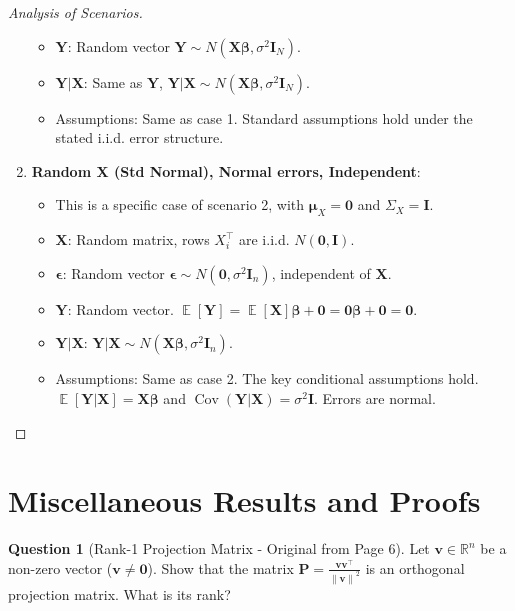 \documentclass[11pt, a4paper]{article}
\DeclareMathOperator{\E}{\mathbb{E}}             %
\DeclareMathOperator{\Cov}{\mathrm{Cov}}         %
\theoremstyle{definition}
\newtheorem{question}[theorem]{Question} %
\theoremstyle{remark}
\newcommand{\RR}{\mathbb{R}}             %
\newcommand{\mat}[1]{\mathbf{#1}}       %
\newcommand{\vect}[1]{\bm{#1}}          %
\newcommand{\transpose}{^{\top}}        %
\newcommand{\norm}[1]{\left\| #1 \right\|} %
\begin{document}
\begin{proof}[Analysis of Scenarios]
\begin{enumerate}
\begin{itemize}
            \item $\vect{Y}$: Random vector $\vect{Y} \sim N(\mat{X}\vect{\beta}, \sigma^2 \mat{I}_N)$.
            \item $\vect{Y}|\mat{X}$: Same as $\vect{Y}$, $\vect{Y}|\mat{X} \sim N(\mat{X}\vect{\beta}, \sigma^2 \mat{I}_N)$.
            \item Assumptions: Same as case 1. Standard assumptions hold under the stated i.i.d. error structure.
        \end{itemize}
    \item \textbf{Random X (Std Normal), Normal errors, Independent}:
        \begin{itemize}
            \item This is a specific case of scenario 2, with $\vect{\mu}_X = \vect{0}$ and $\Sigma_X = \mat{I}$.
            \item $\mat{X}$: Random matrix, rows $X_i\transpose$ are i.i.d. $N(\vect{0}, \mat{I})$.
            \item $\vect{\epsilon}$: Random vector $\vect{\epsilon} \sim N(\vect{0}, \sigma^2 \mat{I}_n)$, independent of $\mat{X}$.
            \item $\vect{Y}$: Random vector. $\E[\vect{Y}] = \E[\mat{X}]\vect{\beta} + \vect{0} = \mat{0}\vect{\beta} + \vect{0} = \vect{0}$.
            \item $\vect{Y}|\mat{X}$: $\vect{Y}|\mat{X} \sim N(\mat{X}\vect{\beta}, \sigma^2 \mat{I}_n)$.
            \item Assumptions: Same as case 2. The key conditional assumptions hold. $\E[\vect{Y}|\mat{X}] = \mat{X}\vect{\beta}$ and $\Cov(\vect{Y}|\mat{X}) = \sigma^2 \mat{I}$. Errors are normal.
        \end{itemize}
\end{enumerate}
\end{proof}

\section{Miscellaneous Results and Proofs}

\begin{question}[Rank-1 Projection Matrix - Original from Page 6]
Let $\vect{v} \in \RR^n$ be a non-zero vector ($\vect{v} \neq \vect{0}$). Show that the matrix $\mat{P} = \frac{\vect{v}\vect{v}\transpose}{\norm{\vect{v}}^2}$ is an orthogonal projection matrix. What is its rank?
\end{question}
\end{document}
